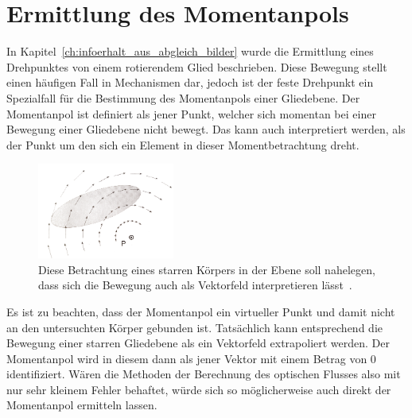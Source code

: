 
\chapter{Ermittlung des Momentanpols}\label{ch:ermittlung_momentanpol}


In Kapitel~\ref{ch:infoerhalt_aus_abgleich_bilder} wurde die Ermittlung eines Drehpunktes von einem rotierendem Glied beschrieben.
Diese Bewegung stellt einen häufigen Fall in Mechanismen dar, jedoch ist der feste Drehpunkt ein Spezialfall für die Bestimmung des Momentanpols einer Gliedebene.
Der Momentanpol ist definiert als jener Punkt, welcher sich momentan bei einer Bewegung einer Gliedebene nicht bewegt.
Das kann auch interpretiert werden, als der Punkt um den sich ein Element in dieser Momentbetrachtung dreht.

\begin{figure}
    \centering
    \includegraphics[width=0.4\textwidth]{gfx/mechanismentechnik_vektorfeld_momentanpol.png}
    \caption[Vektorfeld der ebenen Bewegung]{Diese Betrachtung eines starren Körpers in der Ebene soll nahelegen, dass sich die Bewegung auch als Vektorfeld interpretieren lässt~\cite{Goessner2016}.}\label{fig:mechanismentechnik_vektorfeld_momentanpol}
\end{figure}

Es ist zu beachten, dass der Momentanpol ein virtueller Punkt und damit nicht an den untersuchten Körper gebunden ist.
Tatsächlich kann entsprechend die Bewegung einer starren Gliedebene als ein Vektorfeld extrapoliert werden.
Der Momentanpol wird in diesem dann als jener Vektor mit einem Betrag von $0$ identifiziert.
Wären die Methoden der Berechnung des optischen Flusses also mit nur sehr kleinem Fehler behaftet, würde sich so möglicherweise auch direkt der Momentanpol ermitteln lassen.

